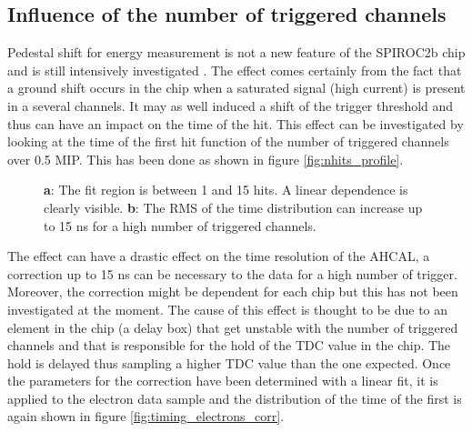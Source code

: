 \documentclass[twoside,a4paper,11pt]{article}
\begin{document}
\subsection{Influence of the number of triggered channels}
\label{subsec:ped_shift}

Pedestal shift for energy measurement is not a new feature of the SPIROC2b chip and is still intensively investigated \cite{OskarMaster}. The effect comes certainly from the fact that a ground shift occurs in the chip when a saturated signal (high current) is present in a several channels. It may as well induced a shift of the trigger threshold and thus can have an impact on the time of the hit. This effect can be investigated by looking at the time of the first hit function of the number of triggered channels over 0.5 MIP. This has been done as shown in figure \ref{fig:nhits_profile}.
\begin{figure}[htbp]
	\hfill
	\caption[]{\textbf{a}: The fit region is between 1 and 15 hits. A linear dependence is clearly visible. \textbf{b}: The RMS of the time distribution can increase up to 15 ns for a high number of triggered channels.}
\end{figure}
The effect can have a drastic effect on the time resolution of the AHCAL, a correction up to 15 ns can be necessary to the data for a high number of trigger. Moreover, the correction might be dependent for each chip but this has not been investigated at the moment. The cause of this effect is thought to be due to an element in the chip (a delay box) that get unstable with the number of triggered channels and that is responsible for the hold of the TDC value in the chip. The hold is delayed thus sampling a higher TDC value than the one expected. Once the parameters for the correction have been determined with a linear fit, it is applied to the electron data sample and the distribution of the time of the first is again shown in figure \ref{fig:timing_electrons_corr}.
\end{document}
